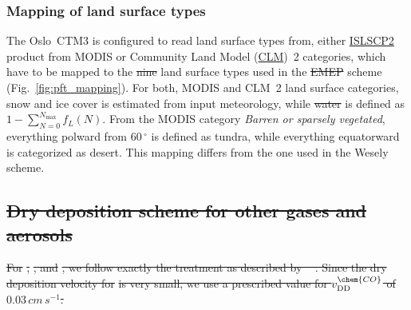 \documentclass[gmd, manuscript]{copernicus}
\providecommand{\DIFadd}[1]{{\protect\color{blue}\uwave{#1}}} %
\providecommand{\DIFdel}[1]{{\protect\color{red}\sout{#1}}}                      %
\providecommand{\DIFaddbegin}{} %
\providecommand{\DIFaddend}{} %
\providecommand{\DIFdelbegin}{} %
\providecommand{\DIFdelend}{} %
\begin{document}
\subsubsection{Mapping of land surface types}
The Oslo~CTM3 is configured to read land surface types from, either \href{https://daac.ornl.gov/cgi-bin/dataset_lister.pl?p=29}{ISLSCP2} product from MODIS or Community Land Model (\href{http://www.cgd.ucar.edu/tss/clm/}{CLM})~2 categories, which have to be mapped to the \DIFdelbegin \DIFdel{nine }\DIFdelend land surface types used in the \DIFdelbegin \DIFdel{EMEP }\DIFdelend \DIFaddbegin \DIFadd{mOSaic }\DIFaddend scheme (Fig.~\ref{fig:pft_mapping}). For both, MODIS and CLM~2 land surface categories, snow and ice cover is estimated from input meteorology, while \DIFdelbegin \DIFdel{water }\DIFdelend \DIFaddbegin \DIFadd{$f_L^\text{water}$ }\DIFaddend is defined as \DIFdelbegin \DIFdel{$1-\sum_{N=0}^{N_\text{max}} f_L(N)$}\DIFdelend \DIFaddbegin \DIFadd{$1-\sum_{k} f_L^k$}\DIFaddend . From the MODIS category \emph{Barren or sparsely vegetated}, everything polward from $60\,\unit{^\circ}$ is defined as tundra, while everything equatorward is categorized as desert. This mapping differs from the one used in the Wesely scheme.

\DIFdelbegin \subsection{\DIFdel{Dry deposition scheme for other gases and aerosols}}
\addtocounter{subsection}{-1}%
\DIFdel{For }%
\DIFdel{, }%
\DIFdel{, and }%
\DIFdel{, we follow exactly the treatment as described by \mbox{%
\citet{ACP:Simpson2012}}\hspace{0pt}%
. Since the dry deposition velocity for }%
\DIFdel{is very small, we use a prescribed value for $v_\text{DD}^\chem{CO}$ of $0.03\,\unit{cm\,s^{-1}}$.
}%
\end{document}
